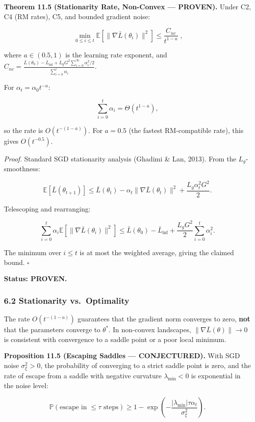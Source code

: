 \documentclass[
  12pt,
]{ctexart}
\begin{document}
\textbf{Theorem 11.5 (Stationarity Rate, Non-Convex --- PROVEN).} Under
C2, C4 (RM rates), C5, and bounded gradient noise:

\[\boxed{\;\min_{0 \leq i \leq t} \mathbb{E}[\|\nabla \bar{L}(\theta_i)\|^2] \leq \frac{C_{nc}}{t^{1-a}}\;},\]

where \(a \in (0.5, 1)\) is the learning rate exponent, and
\(C_{nc} = \frac{\bar{L}(\theta_0) - \bar{L}_{\inf} + L_g G^2 \sum_{i=0}^\infty \alpha_i^2 / 2}{\sum_{i=0}^t \alpha_i}\).

For \(\alpha_t = \alpha_0 t^{-a}\):

\[\sum_{i=0}^t \alpha_i = \Theta(t^{1-a}),\]

so the rate is \(O(t^{-(1-a)})\). For \(a = 0.5\) (the fastest
RM-compatible rate), this gives \(O(t^{-0.5})\).

\emph{Proof.} Standard SGD stationarity analysis (Ghadimi \& Lan, 2013).
From the \(L_g\)-smoothness:

\[\mathbb{E}[\bar{L}(\theta_{t+1})] \leq \bar{L}(\theta_t) - \alpha_t \|\nabla \bar{L}(\theta_t)\|^2 + \frac{L_g \alpha_t^2 G^2}{2}.\]

Telescoping and rearranging:

\[\sum_{i=0}^t \alpha_i \mathbb{E}[\|\nabla \bar{L}(\theta_i)\|^2] \leq \bar{L}(\theta_0) - \bar{L}_{\inf} + \frac{L_g G^2}{2} \sum_{i=0}^t \alpha_i^2.\]

The minimum over \(i \leq t\) is at most the weighted average, giving
the claimed bound. \(\square\)

\textbf{Status: PROVEN.}

\subsubsection{6.2 Stationarity
vs.~Optimality}\label{stationarity-vs.-optimality}

The rate \(O(t^{-(1-a)})\) guarantees that the gradient norm converges
to zero, \textbf{not} that the parameters converge to \(\theta^*\). In
non-convex landscapes, \(\|\nabla \bar{L}(\theta)\| \to 0\) is
consistent with convergence to a saddle point or a poor local minimum.

\textbf{Proposition 11.5 (Escaping Saddles --- CONJECTURED).} With SGD
noise \(\sigma_\xi^2 > 0\), the probability of converging to a strict
saddle point is zero, and the rate of escape from a saddle with negative
curvature \(\lambda_{\min} < 0\) is exponential in the noise level:

\[\mathbb{P}(\text{escape in } \leq \tau \text{ steps}) \geq 1 - \exp\!\left(-\frac{|\lambda_{\min}| \tau \alpha_t}{\sigma_\xi^2}\right).\]
\end{document}
